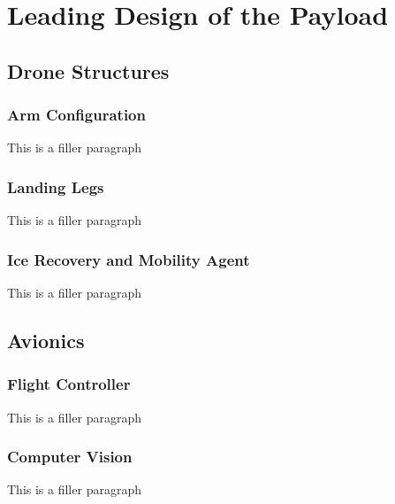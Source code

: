 \chapter{Leading Design of the Payload}

	\section{Drone Structures}
		\subsection{Arm Configuration}
			This is a filler paragraph

		\subsection{Landing Legs}
			This is a filler paragraph
	
		\subsection{Ice Recovery and Mobility Agent}
			This is a filler paragraph

	\section{Avionics}
		\subsection{Flight Controller}
			This is a filler paragraph

		\subsection{Computer Vision}
			This is a filler paragraph
